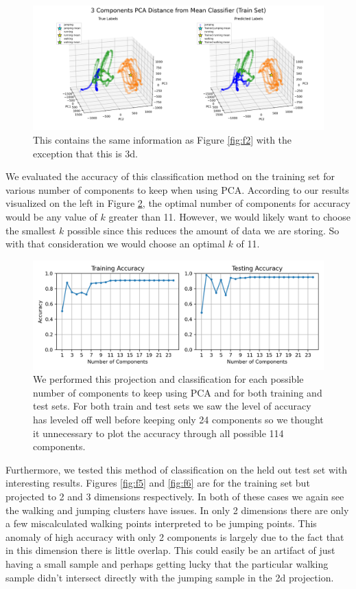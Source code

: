 \documentclass[11pt]{amsart}
\begin{document}
\begin{figure}[h]
	\centering
	\includegraphics[width=.75\textwidth]{../visualizations/pca_distance_from_mean_classifier_3d.png}
 	\caption{This contains the same information as Figure \ref{fig:f2} with the exception that this is 3d.}\label{fig:f3}
\end{figure}

We evaluated the accuracy of this classification method on the training set for various number of components to keep when using PCA.
According to our results visualized on the left in Figure \ref{fig:f4}, the optimal number of components for accuracy would be any value of $k$ greater than 11.
However, we would likely want to choose the smallest $k$ possible since this reduces the amount of data we are storing.
So with that consideration we would choose an optimal $k$ of 11.

\begin{figure}[h]
	\centering
	\includegraphics[width=.75\textwidth]{../visualizations/train_and_test_accuracy_by_num_components.png}
 	\caption{We performed this projection and classification for each possible number of components to keep using PCA and for both training and test sets.
	For both train and test sets we saw the level of accuracy has leveled off well before keeping only 24 components so we thought it unnecessary to plot the accuracy through all possible 114 components. }\label{fig:f4}
\end{figure}

Furthermore, we tested this method of classification on the held out test set with interesting results.
Figures \ref{fig:f5} and \ref{fig:f6} are for the training set but projected to 2 and 3 dimensions respectively.
In both of these cases we again see the walking and jumping clusters have issues.
In only 2 dimensions there are only a few miscalculated walking points interpreted to be jumping points.
This anomaly of high accuracy with only 2 components is largely due to the fact that in this dimension there is little overlap.
This could easily be an artifact of just having a small sample and perhaps getting lucky that the particular walking sample didn't intersect directly with the jumping sample in the 2d projection.
\end{document}
